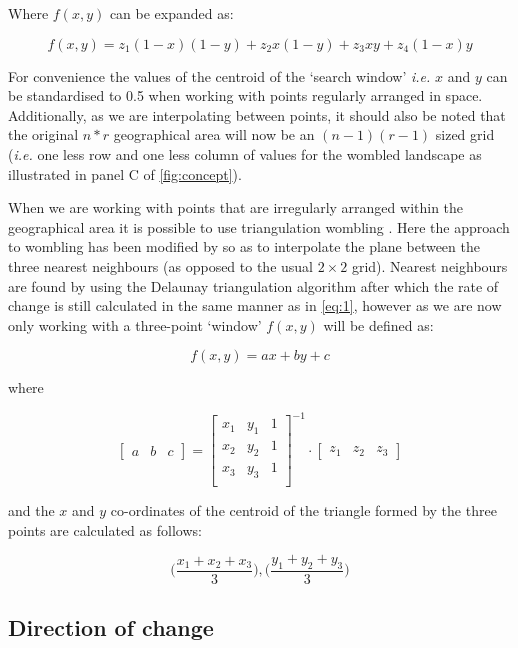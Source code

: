 Where \(f(x,y)\) can be expanded as:

$$f(x,y) = z_{1}(1-x)(1-y) + z_{2}x(1-y) + z_{3}x y + z_{4}(1-x)y$$

For convenience the values of the centroid of the `search window'
\emph{i.e.} \(x\) and \(y\) can be standardised to 0.5 when working with
points regularly arranged in space. Additionally, as we are
interpolating between points, it should also be noted that the original
\(n*r\) geographical area will now be an \((n -1)(r - 1)\) sized grid
(\emph{i.e.} one less row and one less column of values for the wombled
landscape as illustrated in panel C of \autoref{fig:concept}).

When we are working with points that are irregularly arranged within the
geographical area it is possible to use triangulation wombling
\cite{Fortin2005SpaAna, Fortin2021NetEco, Fortin1994EdgDet}. Here the
approach to wombling has been modified by \cite{Fortin1992DetEco} so as to
interpolate the plane between the three nearest neighbours (as opposed
to the usual \(2 \times 2\) grid). Nearest neighbours are found by using
the Delaunay triangulation algorithm \cite{Delaunay1934SphVid} after
which the rate of change is still calculated in the same manner as in
\autoref{eq:1}, however as we are now only working with a three-point
`window' \(f(x,y)\) will be defined as:

$$f(x,y) = ax + by + c$$

where

$$\left[ \begin{array}{ccc} a & b & c \end{array} \right] = 
\left[ {\begin{array}{ccc}
   x_{1} & y_{1} & 1\\
   x_{2} & y_{2} & 1\\
   x_{3} & y_{3} & 1\\
  \end{array} } \right]^{-1}\cdot
  \left[
  \begin{array}{ccc} z_{1} & z_{2} & z_{3} \end{array} \right]$$

and the \(x\) and \(y\) co-ordinates of the centroid of the triangle
formed by the three points are calculated as follows:

$$ \Big( \frac{x_{1} + x_{2} + x_{3}}{3} \Big), \Big( \frac{y_{1} + y_{2} + y_{3}}{3} \Big) $$

\subsection{Direction of change}\label{direction-of-change}

